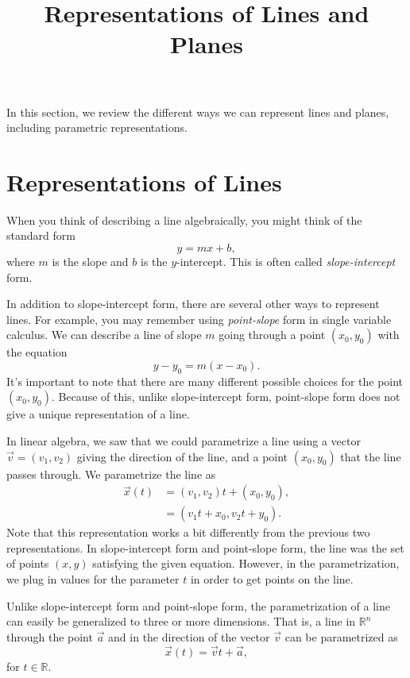 \documentclass{ximera}
\title{Representations of Lines and Planes}
\begin{document}
  
\begin{abstract}  
\end{abstract}  
\maketitle 

In this section, we review the different ways we can represent lines and planes, including parametric representations.

\section*{Representations of Lines}

When you think of describing a line algebraically, you might think of the standard form
\[
y = mx + b,
\]
where $m$ is the slope and $b$ is the $y$-intercept. This is often called \emph{slope-intercept} form.

 In addition to slope-intercept form, there are several other ways to represent lines. For example, you may remember using \emph{point-slope} form in single variable calculus. We can describe a line of slope $m$ going through a point $(x_0, y_0)$ with the equation
 \[
 y-y_0 = m(x-x_0).
 \]
 It's important to note that there are many different possible choices for the point $(x_0,y_0)$. Because of this, unlike slope-intercept form, point-slope form does not give a unique representation of a line.
 
 In linear algebra, we saw that we could parametrize a line using a vector $\vec{v}=(v_1,v_2)$ giving the direction of the line, and a point $(x_0, y_0)$ that the line passes through. We parametrize the line as
 \begin{align*}
 \vec{x}(t) &= (v_1,v_2)t+ (x_0, y_0),\\
 &= (v_1t+x_0, v_2t+y_0).
 \end{align*}
 Note that this representation works a bit differently from the previous two representations. In slope-intercept form and point-slope form, the line was the set of points $(x,y)$ satisfying the given equation. However, in the parametrization, we plug in values for the parameter $t$ in order to get points on the line.
 
 Unlike slope-intercept form and point-slope form, the parametrization of a line can easily be generalized to three or more dimensions. That is, a line in $\mathbb{R}^n$ through the point $\vec{a}$ and in the direction of the vector $\vec{v}$ can be parametrized as
 \[
 \vec{x}(t) = \vec{v}t + \vec{a},
 \]
 for $t\in\mathbb{R}$. 
 
\end{document}
